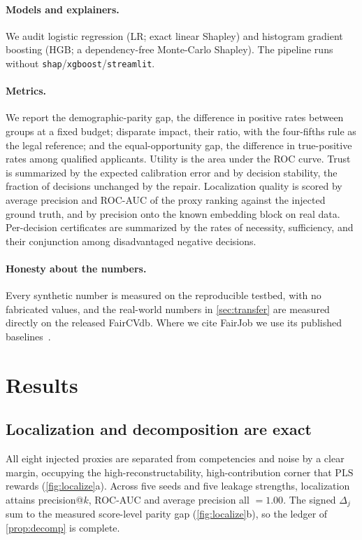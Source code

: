 \documentclass[sn-mathphys-num]{sn-jnl}
\newcommand{\PLS}{\mathrm{PLS}}
\begin{document}
\paragraph{Models and explainers.}
We audit logistic regression (LR; exact linear Shapley) and histogram gradient
boosting (HGB; a dependency-free Monte-Carlo Shapley). The pipeline runs without
\texttt{shap}/\texttt{xgboost}/\texttt{streamlit}.

\paragraph{Metrics.}
We report the demographic-parity gap, the difference in positive rates between
groups at a fixed budget; disparate impact, their ratio, with the four-fifths rule
as the legal reference; and the equal-opportunity gap, the difference in
true-positive rates among qualified applicants. Utility is the area under the ROC
curve. Trust is summarized by the expected calibration error and by decision
stability, the fraction of decisions unchanged by the repair. Localization quality
is scored by average precision and ROC-AUC of the proxy ranking against the
injected ground truth, and by precision onto the known embedding block on real
data. Per-decision certificates are summarized by the rates of necessity,
sufficiency, and their conjunction among disadvantaged negative decisions.

\paragraph{Honesty about the numbers.}
Every synthetic number is measured on the reproducible testbed, with no fabricated
values, and the real-world numbers in \cref{sec:transfer} are measured directly on
the released FairCVdb. Where we cite FairJob we use its published
baselines~\cite{vladimirova2024fairjob}.

\section{Results}
\label{sec:results}

\subsection{Localization and decomposition are exact}
\label{sec:results-loc}
All eight injected proxies are separated from competencies and noise by a clear
margin, occupying the high-reconstructability, high-contribution corner that
$\PLS$ rewards (\cref{fig:localize}a). Across five seeds and five leakage
strengths, localization attains precision@$k$, ROC-AUC and average precision all
$=1.00$. The signed $\Delta_j$ sum to the measured score-level parity gap
(\cref{fig:localize}b), so the ledger of \cref{prop:decomp} is complete.
\end{document}

